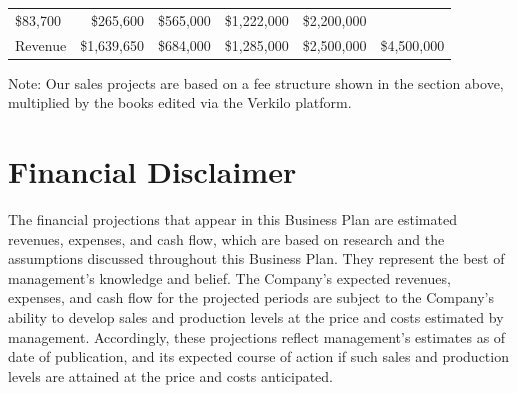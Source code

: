 \documentclass[11pt,openany]{book}
\begin{document}
\begin{longtable}[]{@{}lrrrrr@{}}
\begin{minipage}[t]{0.12\columnwidth}
\$83,700\strut
\end{minipage} & \begin{minipage}[t]{0.12\columnwidth}\raggedleft
\$265,600\strut
\end{minipage} & \begin{minipage}[t]{0.12\columnwidth}\raggedleft
\$565,000\strut
\end{minipage} & \begin{minipage}[t]{0.12\columnwidth}\raggedleft
\$1,222,000\strut
\end{minipage} & \begin{minipage}[t]{0.12\columnwidth}\raggedleft
\$2,200,000\strut
\end{minipage}\tabularnewline
\begin{minipage}[t]{0.25\columnwidth}\raggedright
Revenue\strut
\end{minipage} & \begin{minipage}[t]{0.12\columnwidth}\raggedleft
\$1,639,650\strut
\end{minipage} & \begin{minipage}[t]{0.12\columnwidth}\raggedleft
\$684,000\strut
\end{minipage} & \begin{minipage}[t]{0.12\columnwidth}\raggedleft
\$1,285,000\strut
\end{minipage} & \begin{minipage}[t]{0.12\columnwidth}\raggedleft
\$2,500,000\strut
\end{minipage} & \begin{minipage}[t]{0.12\columnwidth}\raggedleft
\$4,500,000\strut
\end{minipage}\tabularnewline
\bottomrule
\end{longtable}

Note: Our sales projects are based on a fee structure shown in the
section above, multiplied by the books edited via the Verkilo platform.

\hypertarget{financial-disclaimer}{%
\section{Financial Disclaimer}\label{financial-disclaimer}}

The financial projections that appear in this Business Plan are
estimated revenues, expenses, and cash flow, which are based on research
and the assumptions discussed throughout this Business Plan. They
represent the best of management's knowledge and belief. The Company's
expected revenues, expenses, and cash flow for the projected periods are
subject to the Company's ability to develop sales and production levels
at the price and costs estimated by management. Accordingly, these
projections reflect management's estimates as of date of publication,
and its expected course of action if such sales and production levels
are attained at the price and costs anticipated.
\end{document}
